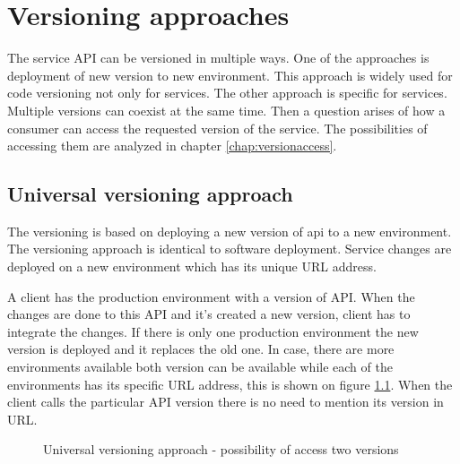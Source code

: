 \chapter{Versioning approaches}
\label{chap:versioning-approaches}

The service API can be versioned in multiple ways. One of the approaches is deployment of new version to new environment. This approach is widely used for code versioning not only for services. The other approach is specific for services. Multiple versions can coexist at the same time. Then a question arises of how a consumer can access the requested version of the service. The possibilities of accessing them are analyzed in chapter \ref{chap:versionaccess}.


\section{Universal versioning approach}
The versioning is based on deploying a new version of \gls{api} to a new environment. The versioning approach is identical to software deployment. Service changes are deployed on a new environment which has its unique URL address. 


A client has the production environment with a version of API. When the changes are done to this API and it's created a new version, client has to integrate the changes. If there is only one production environment the new version is deployed and it replaces the old one. In case, there are more environments available both version can be available while each of the environments has its specific URL address, this is shown on figure \ref{fig:universal-versioning}. When the client calls the particular API version there is no need to mention its version in URL.


\begin{figure}[htp] 
\caption{Universal versioning approach - possibility of access two versions}
\label{fig:universal-versioning}
\end{figure} 


